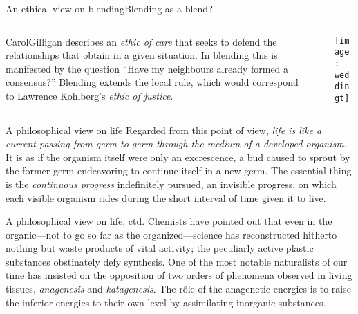 \begin{frame}{An ethical view on blending}{Blending as a blend?}
\begin{columns}[onlytextwidth]
\begin{column}[T]{3in}
{Carol\bsp Gilligan} describes an
\emph{ethic of care} that seeks to defend the
relationships that obtain in a given situation.  In blending this is
manifested by the question ``Have my neighbours already formed a
consensus?''  Blending extends the local rule, which would correspond
to Lawrence Kohlberg's \emph{ethic of justice}.
\end{column}
\begin{column}[T]{.1in}
\end{column}
\begin{column}[T]{2in}
\vspace*{.2in}
\texttt{[image: weddingt]}
\end{column}
\end{columns}
\end{frame}

\begin{frame}{A philosophical view on life}{}
{\small Regarded from this point of view, \emph{life is like a current passing from germ to germ through the medium of a developed organism}. It is as if the organism itself were only an excrescence, a bud caused to sprout by the former germ endeavoring to continue itself in a new germ. The essential thing is the \emph{continuous progress} indefinitely pursued, an invisible progress, on which each visible organism rides during the short interval of time given it to live.} \qquad\qquad {}
\end{frame}

\begin{frame}{A philosophical view on life, ctd.}{}
Chemists have pointed out that even in the organic---not to go so far as the organized---science has reconstructed hitherto nothing but waste products of vital activity; the peculiarly active plastic substances obstinately defy synthesis.  One of the most notable naturalists of our time has insisted on the opposition of two orders of phenomena observed in living tissues, \emph{anagenesis} and \emph{katagenesis}. The r\^{o}le of the anagenetic energies is to raise the inferior energies to their own level by assimilating inorganic substances.\quad {}
\end{frame}

